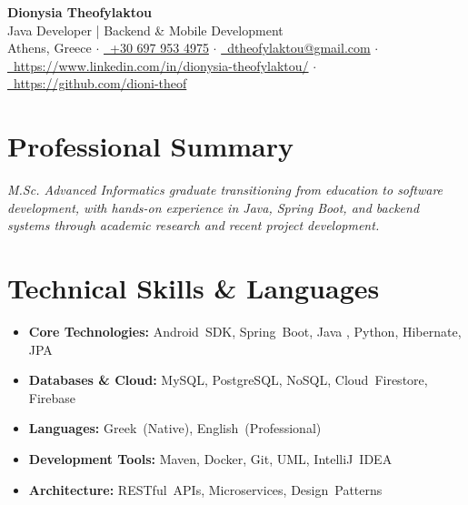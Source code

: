\documentclass[a4paper,11pt]{article}
\begin{document}
\begin{center}
    {\Huge\bfseries\color{primary} Dionysia Theofylaktou}\\[0.2em]
    {\large\color{secondary} Java Developer | Backend \& Mobile Development}\\[0.3em]
    \textcolor{secondary}{
        Athens, Greece $\cdot$
        \href{tel:+306979534975}{\faPhone~+30 697 953 4975} $\cdot$
        \href{mailto:dtheofylaktou@gmail.com}{\faEnvelope~dtheofylaktou@gmail.com} $\cdot$
        \href{https://www.linkedin.com/in/dionysia-theofylaktou//}{\faLinkedin~https://www.linkedin.com/in/dionysia-theofylaktou/} $\cdot$
        \href{https://github.com/dioni-theof}{\faGithub~https://github.com/dioni-theof}
    }
\end{center}

\vspace{0.2em}

\section*{Professional Summary}
\textit{M.Sc. Advanced Informatics graduate transitioning from education to software development, with hands-on experience in Java, Spring Boot, and backend systems through academic research and recent project development.}

\vspace{0.2em}

\section*{Technical Skills \& Languages}
\noindent
\begin{minipage}[t]{0.49\textwidth}
\begin{itemize}[leftmargin=*, noitemsep, topsep=0pt, parsep=1pt, partopsep=0pt]
    \item \textbf{\textcolor{primary}{Core Technologies:}} Android~SDK, Spring~Boot, Java , Python, Hibernate, JPA
    \item \textbf{\textcolor{primary}{Databases \& Cloud:}} MySQL, PostgreSQL, NoSQL, Cloud~Firestore, Firebase
    \item \textbf{\textcolor{primary}{Languages:}} Greek~(Native), English~(Professional)
\end{itemize}
\end{minipage}\hfill
\begin{minipage}[t]{0.49\textwidth}
\begin{itemize}[leftmargin=*, noitemsep, topsep=0pt, parsep=1pt, partopsep=0pt]
    \item \textbf{\textcolor{primary}{Development Tools:}} Maven, Docker, Git, UML, IntelliJ~IDEA
    \item \textbf{\textcolor{primary}{Architecture:}} RESTful~APIs, Microservices, Design~Patterns
\end{itemize}
\end{minipage}
\end{document}
